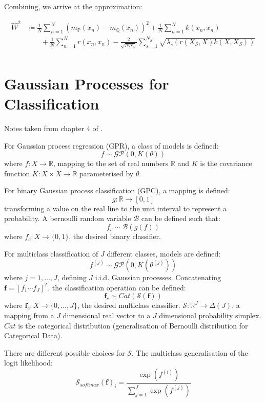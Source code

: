 \documentclass[twoside,11pt]{article}
\begin{document}
Combining, we arrive at the approximation:

\[
\begin{split}
\hat{W}^2 & \coloneqq \frac{1}{N}\sum_{n=1}^N (m_{\mathbb{P}}(x_n)-m_{\mathbb{Q}}(x_n))^2 + \frac{1}{N}\sum_{n=1}^{N}k(x_n, x_n) \\
 &\qquad +\frac{1}{N}\sum_{n=1}^{N}r(x_n, x_n) - \frac{2}{\sqrt {N N_S}}\sum_{s=1}^{N_S}\sqrt {\lambda_s(r(X_S, X)k(X, X_S))} \\
\end{split}\label{eq:w-2-distance-approx}
\]


\section{Gaussian Processes for Classification}\label{sec:gaussian-processes-for-classification}

Notes taken from chapter 4 of \cite{matthews2017scalable}.

For Gaussian process regression (GPR), a class of models is defined:
\[f \sim \mathcal{GP}(0, K(\theta))\]
where $f: X \rightarrow \mathbb{R}$, mapping to the set of real numbers $\mathbb{R}$ and $K$ is the covariance function $K: X \times X \rightarrow \mathbb{R}$ parameterised by $\theta$.

For binary Gaussian process classification (GPC), a mapping is defined:
\[g: \mathbb{R} \rightarrow [0, 1]\]
transforming a value on the real line to the unit interval to represent a probability.
A bernoulli random variable $\mathcal{B}$ can be defined such that:
\[f_c \sim \mathcal{B}(g(f))\]
where $f_c: X \rightarrow \{0, 1\}$, the desired binary classifier.

For multiclass classification of $J$ different classes, models are defined:
\[f^{(j)} \sim \mathcal{GP}(0, K(\theta^{(j)}))\]
where $j=1, \dots, J$, defining $J$ i.i.d. Gaussian processes.
Concatenating $\mathbf{f} = [f_1 \cdots f_J]^T$, the classification operation can be defined:
\[\mathbf{f}_c \sim Cat (\mathcal{S}(\mathbf{f}))\]
where $\mathbf{f}_c: X \rightarrow \{0, \dots, J\}$, the desired multiclass classifier. $\mathcal{S}: \mathbb{R}^J \rightarrow \Delta(J)$, a mapping from a $J$ dimensional real vector to a $J$ dimensional probability simplex. $Cat$ is the categorical distribution (generalisation of Bernoulli distribution for Categorical Data).

There are different possible choices for $\mathcal{S}$.
The multiclass generalisation of the logit likelihood:
\[\mathcal{S}_{softmax}(\mathbf{f})_i = \frac{\exp(f^{(i)})}{\sum_{j=1}^{J} \exp(f^{(j)})}\]
\end{document}
